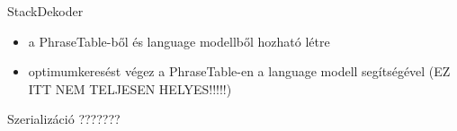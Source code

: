 \begin{frame}{StackDekoder}
	\begin{itemize}
		\item a PhraseTable-ből és language modellből hozható létre
		\item optimumkeresést végez a PhraseTable-en a language modell segítségével (EZ ITT NEM TELJESEN HELYES!!!!!)
		
	\end{itemize}
\end{frame}

\begin{frame}{Szerializáció}
	???????
\end{frame}